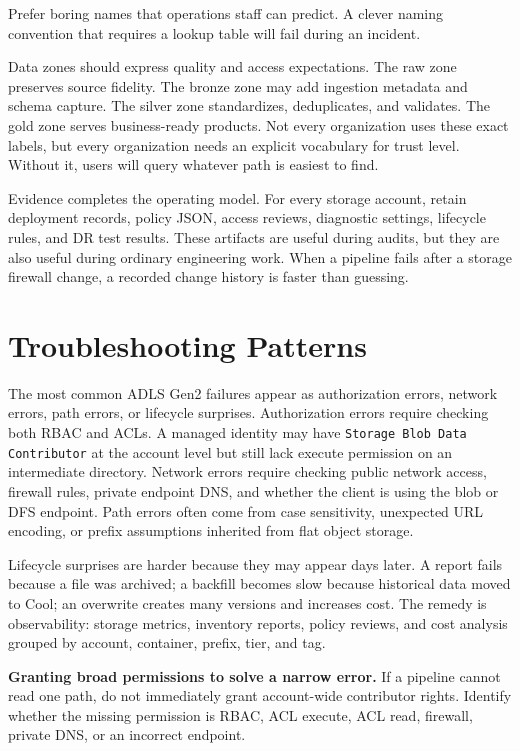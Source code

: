 \begin{tipbox}
Prefer boring names that operations staff can predict. A clever naming convention that requires a lookup table will fail during an incident.
\end{tipbox}

Data zones should express quality and access expectations. The raw zone preserves source fidelity. The bronze zone may add ingestion metadata and schema capture. The silver zone standardizes, deduplicates, and validates. The gold zone serves business-ready products. Not every organization uses these exact labels, but every organization needs an explicit vocabulary for trust level. Without it, users will query whatever path is easiest to find.

Evidence completes the operating model. For every storage account, retain deployment records, policy JSON, access reviews, diagnostic settings, lifecycle rules, and DR test results. These artifacts are useful during audits, but they are also useful during ordinary engineering work. When a pipeline fails after a storage firewall change, a recorded change history is faster than guessing.

\section{Troubleshooting Patterns}
The most common ADLS Gen2 failures appear as authorization errors, network errors, path errors, or lifecycle surprises. Authorization errors require checking both RBAC and ACLs. A managed identity may have \texttt{Storage Blob Data Contributor} at the account level but still lack execute permission on an intermediate directory. Network errors require checking public network access, firewall rules, private endpoint DNS, and whether the client is using the blob or DFS endpoint. Path errors often come from case sensitivity, unexpected URL encoding, or prefix assumptions inherited from flat object storage.

Lifecycle surprises are harder because they may appear days later. A report fails because a file was archived; a backfill becomes slow because historical data moved to Cool; an overwrite creates many versions and increases cost. The remedy is observability: storage metrics, inventory reports, policy reviews, and cost analysis grouped by account, container, prefix, tier, and tag.

\begin{pitfall}
\textbf{Granting broad permissions to solve a narrow error.} If a pipeline cannot read one path, do not immediately grant account-wide contributor rights. Identify whether the missing permission is RBAC, ACL execute, ACL read, firewall, private DNS, or an incorrect endpoint.
\end{pitfall}

